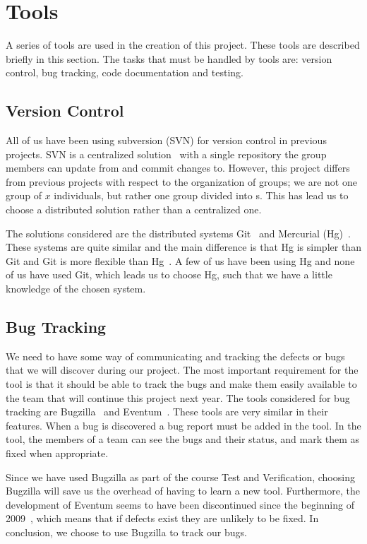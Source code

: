 \section{Tools}\label{subsec:tools}
A series of tools are used in the creation of this project.
These tools are described briefly in this section.
The tasks that must be handled by tools are: version control, bug tracking, code documentation and testing.

\subsection{Version Control}
All of us have been using subversion (SVN) for version control in previous projects.
SVN is a centralized solution~\cite{subversion} with a single repository the group members can update from and commit changes to.
However, this project differs from previous projects with respect to the organization of groups; we are not one group of $x$ individuals, but rather one group divided into \subgroup{}s.
This has lead us to choose a distributed solution rather than a centralized one.

The solutions considered are the distributed systems Git~\citep{githome} and Mercurial (Hg)~\citep{hghome}.
These systems are quite similar and the main difference is that Hg is simpler than Git and Git is more flexible than Hg~\cite{gitVsHg}.
A few of us have been using Hg and none of us have used Git, which leads us to choose Hg, such that we have a little knowledge of the chosen system.

\subsection{Bug Tracking}
We need to have some way of communicating and tracking the defects or bugs that we will discover during our project.
The most important requirement for the tool is that it should be able to track the bugs and make them easily available to the team that will continue this project next year.
The tools considered for bug tracking are Bugzilla~\cite{bugzillaFeat} and Eventum~\cite{eventumFeat}.
These tools are very similar in their features.
When a bug is discovered a bug report must be added in the tool.
In the tool, the members of a team can see the bugs and their status, and mark them as fixed when appropriate.

Since we have used Bugzilla as part of the course Test and Verification, choosing Bugzilla will save us the overhead of having to learn a new tool.
Furthermore, the development of Eventum seems to have been discontinued since the beginning of 2009~\cite{eventumDiscont}, which means that if defects exist they are unlikely to be fixed.
In conclusion, we choose to use Bugzilla to track our bugs.

